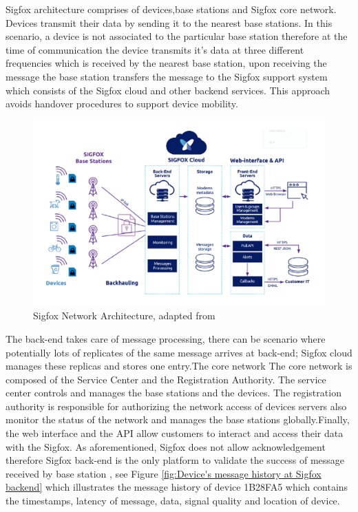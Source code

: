\documentclass[12pt]{article}
\begin{document}
Sigfox architecture comprises of devices,base stations and Sigfox core network. Devices transmit their data by sending it to the nearest base stations. In this scenario, a device is not associated to the particular base station therefore at the time of communication the device transmits it's data at three different frequencies which is received by the nearest base station, upon receiving the message the base station transfers the message to the Sigfox support system which consists of the Sigfox cloud and other backend services. This approach avoids handover procedures to support device mobility.


\begin{figure}[H]
  \includegraphics[width=\textwidth]{Images/sigfox_architecture.pdf}
  \centering
  \caption{Sigfox Network Architecture, adapted from \cite{SigfoxTechnicalDoc}}
  \label{fig:Sigfox Network Architecture}
\end{figure}


The back-end takes care of message processing, there can be scenario where potentially lots of replicates of the same message arrives at back-end; Sigfox cloud manages these replicas and stores one entry.The core network The core network is composed of the Service Center and the Registration Authority. The service center controls and manages the base stations and the devices. The registration authority is responsible for authorizing the network access of devices servers also monitor the status of the network and manages the base stations globally.Finally, the web interface and the API allow customers to interact and access their data with the Sigfox. As aforementioned, Sigfox does not allow acknowledgement therefore Sigfox back-end is the only platform to validate the success of message received by base station  \cite{SigfoxTechnicalDoc,gomez2019sigfox}, see Figure \ref{fig:Device's message history at Sigfox backend} which illustrates the message history of device 1B28FA5 which contains the timestamps, latency of message, data, signal quality and location of device.
\end{document}

